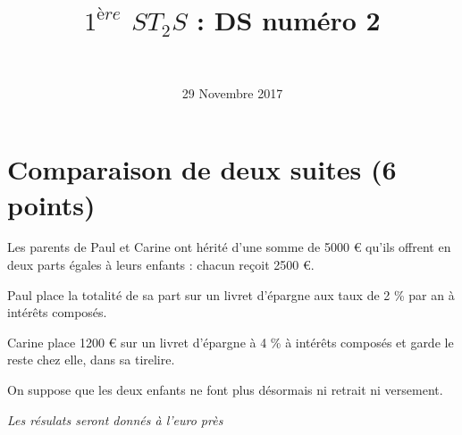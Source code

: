 \documentclass[a4paper,11pt]{exam}
\author{\ }
\date{29 Novembre 2017}
\title{$1^{ère}$ $ST_2S$ : DS num\'ero 2}
\begin{document}
%	

	\maketitle

\section{Comparaison de deux suites (6 points)}

Les parents de Paul et Carine ont hérité d'une somme de \num{5000} € qu'ils offrent en deux parts égales à leurs enfants : chacun reçoit \num{2500} €.

Paul place la totalité de sa part sur un livret d'épargne aux taux de 2 \% par an à intérêts composés.

Carine place \num{1200} € sur un livret d'épargne à 4 \% à intérêts composés et garde le reste chez elle, dans sa tirelire.

On suppose que les deux enfants ne font plus désormais ni retrait ni versement.

\textit{Les résulats seront donnés à l'euro près}
\end{document}
